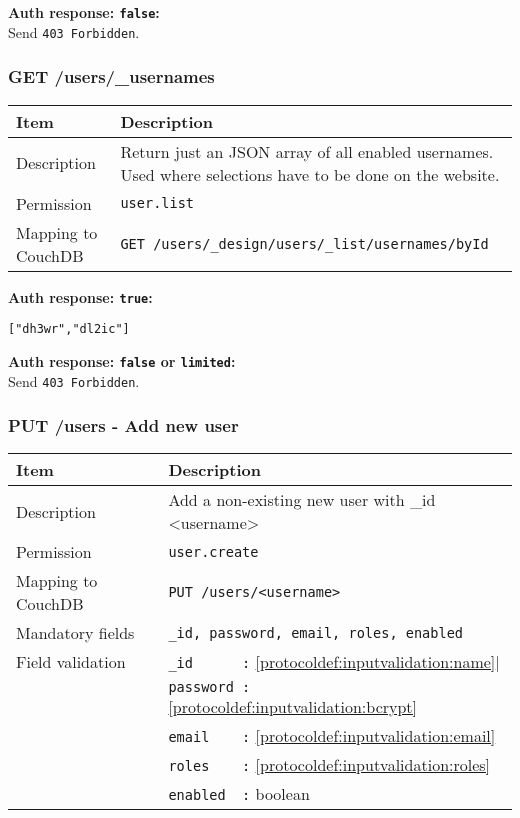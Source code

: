 \textbf{Auth response: \texttt{false}:}\\
Send \verb|403 Forbidden|.


\subsubsection{GET /users/\_usernames}
\label{protocoldef:microservicesapi:database:getusers/_usernames}

\begin{table}[htbp]
  \begin{tabular}{|l|p{12cm}|} \hline
    Item               & Description  \\ \hline \hline
    Description        & Return just an JSON array of all enabled usernames. Used where selections have to be done on the website. \\ \hline
    Permission         & \verb|user.list| \\ \hline
    Mapping to CouchDB & \verb|GET /users/_design/users/_list/usernames/byId|\\ \hline
  \end{tabular}
\end{table}

\textbf{Auth response: \texttt{true}:}
\begin{lstlisting}
["dh3wr","dl2ic"]
\end{lstlisting}

\textbf{Auth response: \texttt{false} or \texttt{limited}:}\\
Send \verb|403 Forbidden|.

\newpage
\subsubsection{PUT /users - Add new user}
\label{protocoldef:microservicesapi:database:putusers/username_create}
\begin{table}[htbp]
  \begin{tabular}{|l|p{12cm}|} \hline
    Item               & Description  \\ \hline \hline
    Description        & Add a non-existing new user with \_id <username>\\ \hline
    Permission         & \verb|user.create| \\ \hline
    Mapping to CouchDB & \verb|PUT /users/<username>|\\ \hline
    Mandatory fields   & \verb|_id, password, email, roles, enabled| \\ \hline
    Field validation   & \verb|_id      :| \ref{protocoldef:inputvalidation:name}| \\
                       & \verb|password :| \ref{protocoldef:inputvalidation:bcrypt} \\
                       & \verb|email    :| \ref{protocoldef:inputvalidation:email} \\
                       & \verb|roles    :| \ref{protocoldef:inputvalidation:roles} \\
                       & \verb|enabled  :| boolean\\ \hline
  \end{tabular}
\end{table}

